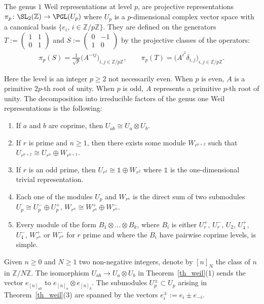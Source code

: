The genus $1$ Weil representations at level $p$, are projective representations $\pi_p \colon \SL_2(\mathbb{Z}) \rightarrow \PGL(U_p)$ where $U_p$ is a $p$-dimensional complex vector space with a canonical basis $\{e_i, \, i \in \mathbb{Z}/p\mathbb{Z} \}$. They are defined on the generators $T:= \left(\begin{smallmatrix} 1&1\\0&1 \end{smallmatrix}\right)$ and $S:=\left(\begin{smallmatrix} 0& -1 \\ 1&0 \end{smallmatrix}\right)$ by the projective classes of the operators:
 \begin{gather*}
\pi_p (S) = \frac{1}{\sqrt{p}} \big( A^{-ij}\big)_{i,j \in \mathbb{Z}/p\mathbb{Z}},\qquad
\pi_p(T) = \big( A^{i^2}\delta_{i,j} \big)_{i,j \in \mathbb{Z}/p\mathbb{Z}}.
\end{gather*}

 Here the level is an integer $p\geq 2$ not necessarily even. When $p$ is even, $A$ is a primitive $2p$-{th} root of unity. When $p$ is odd, $A$ represents a primitive $p$-{th} root of unity. The decomposition into irreducible factors of the genus one Weil representations is the following:

\begin{Theorem} \label{th_weil}\quad
\begin{enumerate}\itemsep=0pt
\item[$1.$] If $a$ and $b$ are coprime, then $U_{ab}\cong U_a \otimes U_b$.
\item[$2.$] If $r$ is prime and $n\geq 1$, then there exists some module $W_{r^{n+2}}$ such that $U_{r^{n+2}}\cong U_{r^n}\oplus W_{r^{n+2}}$.
\item[$3.$] If $r$ is an odd prime, then $U_{r^2}\cong \mathds{1}\oplus W_{r^2}$ where $\mathds{1}$ is the one-dimensional trivial representation.
\item[$4.$] Each one of the modules $U_p$ and $W_{r^n}$ is the direct sum of two submodules $U_p\cong U_p^-\oplus U_p^+$, $W_{r^n}\cong W_{r^n}^+\oplus W_{r^n}^-$.
\item[$5.$] Every module of the form $B_{1}\otimes \dots \otimes B_{k}$, where $B_{i}$ is either $U_{r}^+$, $U_{r}^-$, $U_2$, $U_4^+$, $U_4^-$, $W_{r^n}^+$ or $W_{r^n}^-$ for $r$ prime and where the $B_i$ have pairwise coprime levels, is simple.
\end{enumerate}
\end{Theorem}
Given $n\geq0$ and $N\geq 1$ two non-negative integers, denote by $[n]_N$ the class of $n$ in $\mathbb{Z}/N\mathbb{Z}$. The isomorphism $U_{ab}\rightarrow U_a\otimes U_b$ in Theorem~\ref{th_weil}(1) sends the vector $e_{[n]_{ab}}$ to $e_{[n]_a}\otimes e_{[n]_b}$. The submodules $U_p^{\pm}\subset U_p$ arising in Theorem~\ref{th_weil}(3) are spanned by the vectors $e_i^{\pm}:= e_i \pm e_{-i}$.

